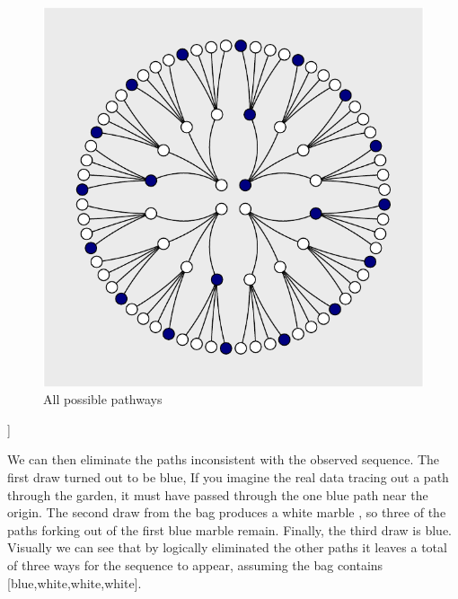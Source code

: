 \documentclass{article}
\begin{document}
\begin{figure}

{\centering \includegraphics{qrap_paper_files/figure-latex/forking_paths-1} 

}

\caption{All possible pathways}\label{fig:forking_paths}
\end{figure}

{]}

We can then eliminate the paths inconsistent with the observed sequence.
The first draw turned out to be blue, If you imagine the real data
tracing out a path through the garden, it must have passed through the
one blue path near the origin. The second draw from the bag produces a
white marble , so three of the paths forking out of the first blue
marble remain. Finally, the third draw is blue. Visually we can see that
by logically eliminated the other paths it leaves a total of three ways
for the sequence to appear, assuming the bag contains
{[}blue,white,white,white{]}.
\end{document}

